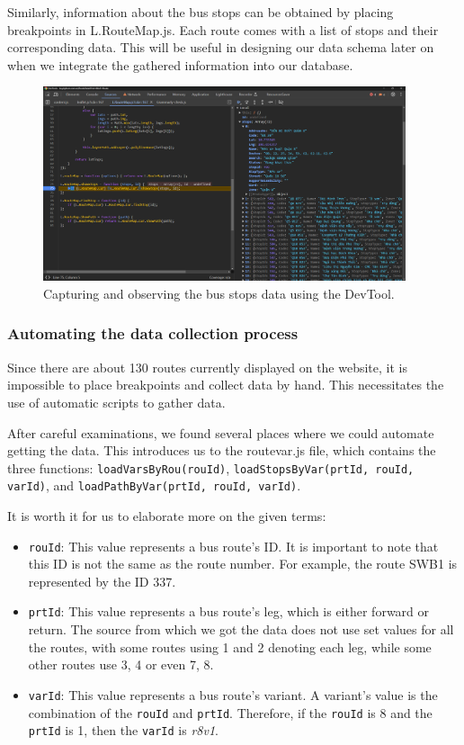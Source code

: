 \newpage
Similarly, information about the bus stops can be obtained by placing breakpoints in L.RouteMap.js. Each route comes with a list of stops and their corresponding data. This will be useful in designing our data schema later on when we integrate the gathered information into our database.

\begin{figure}[H]
    \centering
    \includegraphics[width=0.95\textwidth]{assets/images/Research/Bus/stop_web.png}
    \caption{Capturing and observing the bus stops data using the DevTool.}
    \label{fig:stop_data}
\end{figure}

\subsubsection{Automating the data collection process}

Since there are about 130 routes currently displayed on the website, it is impossible to place breakpoints and collect data by hand. This necessitates the use of automatic scripts to gather data.

After careful examinations, we found several places where we could automate getting the data. This introduces us to the routevar.js file, which contains the three functions: \lstinline{loadVarsByRou(rouId)}, \lstinline{loadStopsByVar(prtId, rouId, varId)}, and \lstinline{loadPathByVar(prtId, rouId, varId)}.

It is worth it for us to elaborate more on the given terms:
\begin{itemize}
    \item \lstinline{rouId}: This value represents a bus route's ID. It is important to note that this ID is not the same as the route number. For example, the route SWB1 is represented by the ID 337. 
    \item \lstinline{prtId}: This value represents a bus route's leg, which is either forward or return. The source from which we got the data does not use set values for all the routes, with some routes using 1 and 2 denoting each leg, while some other routes use 3, 4 or even 7, 8. 
    \item \lstinline{varId}: This value represents a bus route's variant. A variant's value is the combination of the \lstinline{rouId} and \lstinline{prtId}. Therefore, if the \lstinline{rouId} is 8 and the \lstinline{prtId} is 1, then the \lstinline{varId} is \textit{r8v1}.
\end{itemize}

